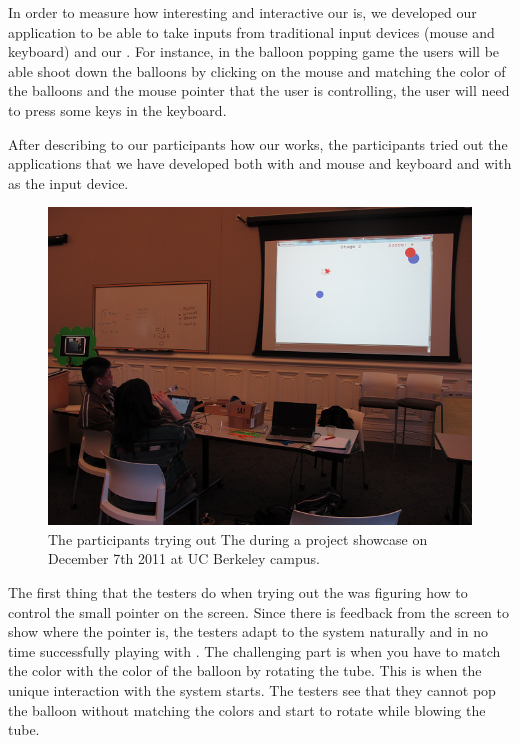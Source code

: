 In order to measure how interesting and interactive our \tube is, we developed our application to be able to take inputs from traditional input devices (\ie mouse and keyboard) and our \tube. For instance, in the balloon popping game the users will be able shoot down the balloons by clicking on the mouse and matching the color of the balloons and the mouse pointer that the user is controlling, the user will need to press some keys in the keyboard.

After describing to our participants how our \tube works, the participants tried out the applications that we have developed both with and mouse and keyboard and with \tube as the input device.

\begin{figure}
  \centering
  \includegraphics[width=\linewidth]{./figs/impl2.png}
  \caption{The participants trying out The \tube during a project showcase on December 7th 2011 at UC Berkeley campus.}
  \label{fig:impl2}
\end{figure}

The first thing that the testers do when trying out the \tube was figuring how to control the small pointer on the screen. Since there is feedback from the screen to show where the pointer is, the testers adapt to the system naturally and in no time successfully playing with \tube. The challenging part is when you have to match the color with the color of the balloon by rotating the tube. This is when the unique interaction with the system starts. The testers see that they cannot pop the balloon without matching the colors and start to rotate while blowing the tube.

